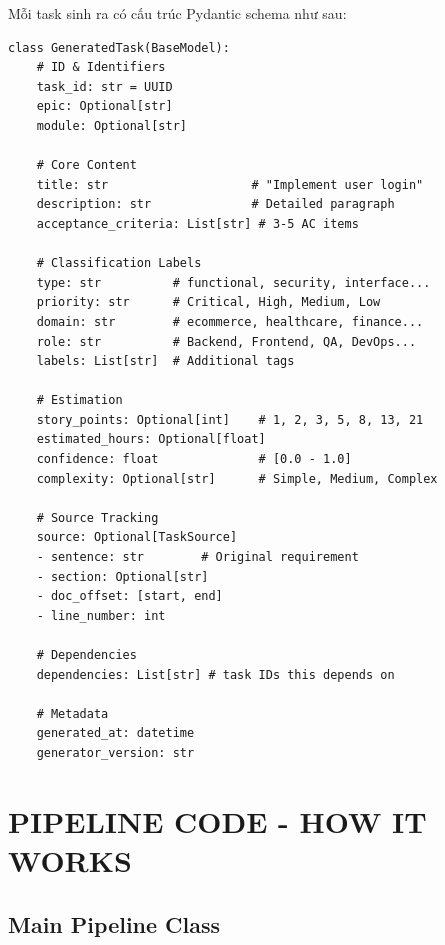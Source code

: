 \documentclass[12pt, a4paper]{report}
\begin{document}
Mỗi task sinh ra có cấu trúc Pydantic schema như sau:

\begin{tcolorbox}[colback=gray!5]
\begin{lstlisting}
class GeneratedTask(BaseModel):
    # ID & Identifiers
    task_id: str = UUID
    epic: Optional[str]
    module: Optional[str]
    
    # Core Content
    title: str                    # "Implement user login"
    description: str              # Detailed paragraph
    acceptance_criteria: List[str] # 3-5 AC items
    
    # Classification Labels
    type: str          # functional, security, interface...
    priority: str      # Critical, High, Medium, Low
    domain: str        # ecommerce, healthcare, finance...
    role: str          # Backend, Frontend, QA, DevOps...
    labels: List[str]  # Additional tags
    
    # Estimation
    story_points: Optional[int]    # 1, 2, 3, 5, 8, 13, 21
    estimated_hours: Optional[float]
    confidence: float              # [0.0 - 1.0]
    complexity: Optional[str]      # Simple, Medium, Complex
    
    # Source Tracking
    source: Optional[TaskSource]
    - sentence: str        # Original requirement
    - section: Optional[str]
    - doc_offset: [start, end]
    - line_number: int
    
    # Dependencies
    dependencies: List[str] # task IDs this depends on
    
    # Metadata
    generated_at: datetime
    generator_version: str
\end{lstlisting}
\end{tcolorbox}

\newpage

\chapter{PIPELINE CODE - HOW IT WORKS}

\section{Main Pipeline Class}
\end{document}
